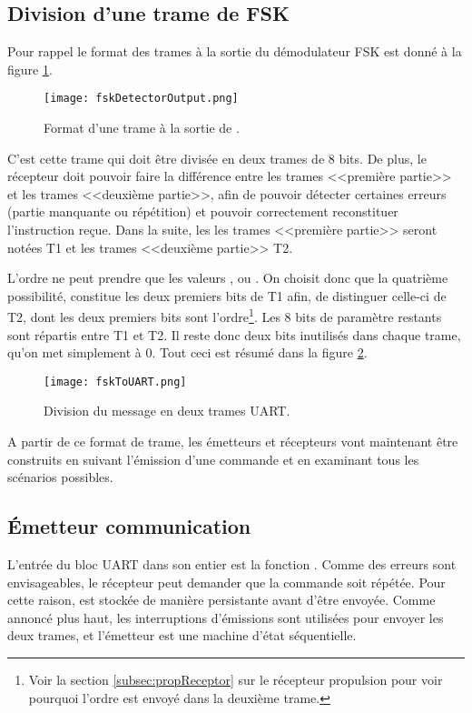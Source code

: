 \subsection{Division d'une trame de FSK}
Pour rappel le format des trames à la sortie du démodulateur FSK est donné à la figure \ref{fig:fskDetectorOutput}.
\begin{figure}[htbp]
  \centering
  \texttt{[image: fskDetectorOutput.png]}
  \caption{Format d'une trame à la sortie de .\label{fig:fskDetectorOutput}}
\end{figure}
C'est cette trame qui doit être divisée en deux trames de 8 bits. De plus, le récepteur doit pouvoir faire la différence entre les trames <<première partie>> et les trames <<deuxième partie>>, afin de pouvoir détecter certaines erreurs (partie manquante ou répétition) et pouvoir correctement reconstituer l'instruction reçue. Dans la suite, les les trames <<première partie>> seront notées T1 et les trames <<deuxième partie>> T2.

L'ordre ne peut prendre que les valeurs ,  ou . On choisit donc que la quatrième possibilité,  constitue les deux premiers bits de T1 afin, de distinguer celle-ci de T2, dont les deux premiers bits sont l'ordre\footnote{Voir la section \ref{subsec:propReceptor} sur le récepteur propulsion pour voir pourquoi l'ordre est envoyé dans la deuxième trame.}. Les 8 bits de paramètre restants sont répartis entre T1 et T2. Il reste donc deux bits inutilisés dans chaque trame, qu'on met simplement à 0. Tout ceci est résumé dans la figure \ref{fig:fskToUART}.
\begin{figure}[htbp]
  \centering
  \texttt{[image: fskToUART.png]}
  \caption{Division du message en deux trames UART.\label{fig:fskToUART}}
\end{figure}

A partir de ce format de trame, les émetteurs et récepteurs vont maintenant être construits en suivant l'émission d'une commande et en examinant tous les scénarios possibles.

\subsection{\'Emetteur communication}
L'entrée du bloc UART dans son entier est la fonction . Comme des erreurs sont envisageables, le récepteur peut demander que la commande soit répétée. Pour cette raison,  est stockée de manière persistante avant d'être envoyée. Comme annoncé plus haut, les interruptions d'émissions sont utilisées pour envoyer les deux trames, et l'émetteur est une machine d'état séquentielle.

